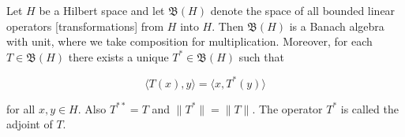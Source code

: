 Let $H$ be a Hilbert space and let $\mathfrak{B}(H)$ denote the space of all bounded linear operators [transformations] from $H$ into $H$. Then $\mathfrak{B}(H)$ is a Banach algebra with unit, where we take composition for multiplication. Moreover, for each $T \in \mathfrak{B}(H)$ there exists a unique $T^* \in \mathfrak{B}(H)$ such that

$$\langle T(x), y \rangle = \langle x, T^*(y) \rangle$$

for all $x, y \in H$. Also $T^{**} = T$ and $\|T^*\| = \|T\|$. The operator $T^*$ is called the adjoint of $T$.